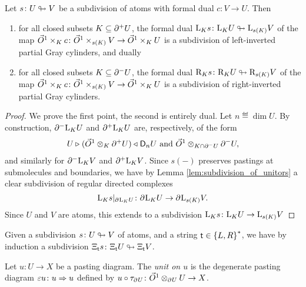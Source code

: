 \begin{lem} \label{lem:subdivision_of_invertors}
    Let \( s \colon U \looparrowright V \) be a subdivision of atoms with formal dual \( c \colon V \to U \).
    Then
    \begin{enumerate}
        \item for all closed subsets \( K \subseteq \partial_{}^{+} U \), the formal dual \( \mathrm{L}_{K} s \colon \mathrm{L}_{K} U \looparrowright \mathrm{L}_{s(K)} V \) of the map \( \vec{O}^{1} \times_K c \colon \vec{O}^{1} \times_{s(K)} V \to \vec{O}^{1} \times_K U \) is a subdivision of left-inverted partial Gray cylinders, and dually
        \item for all closed subsets \( K \subseteq \partial_{}^{-} U \), the formal dual \( \mathrm{R}_{K} s \colon \mathrm{R}_{K} U \looparrowright \mathrm{R}_{s(K)} V \) of the map \( \vec{O}^{1} \times_K c \colon \vec{O}^{1} \times_{s(K)} V \to \vec{O}^{1} \times_K U \)  is a subdivision of right-inverted partial Gray cylinders.
    \end{enumerate}
\end{lem}
\begin{proof}
    We prove the first point, the second is entirely dual.
    Let \( n \eqdef \dim U \).
    By construction, \( \partial_{}^{-} \mathrm{L}_{K} U \) and \( \partial_{}^{+} \mathrm{L}_{K} U \) are, respectively, of the form
    \begin{equation*}
        U \triangleright_{} (\vec{O}^{1} \otimes_K \partial_{}^{+} U) \prescript{}{\!}{\triangleleft}\; \mathsf{D}_{n}{U} \text{ and } \vec{O}^{1} \otimes_{K \cap \partial_{}^{-} U} \partial_{}^{-} U,
    \end{equation*}
    and similarly for \( \partial_{}^{-} \mathrm{L}_{K} V \) and \( \partial_{}^{+} \mathrm{L}_{K} V \).
    Since \( s(-) \) preserves pastings at submolecules and boundaries, we have by Lemma \ref{lem:subdivision_of_unitors} a clear subdivision of regular directed complexes 
    \begin{equation*}
        \restr{\lcyl{K} s}{\bd{}{} \lcyl{K} U} \colon \bd{}{} \lcyl{K} U \to \bd{}{} \lcyl{s(K)} V.
    \end{equation*}
    Since \( U \) and \( V \) are atoms, this extends to a subdivision \( \mathrm{L}_{K} s \colon \mathrm{L}_{K} U \to \mathrm{L}_{s(K)} V \)
\end{proof}

\begin{rmk}
    Given a subdivision \( s \colon U \looparrowright V \) of atoms, and a string \( \mathsf{t} \in \left\{ {L, R} \right\}^* \), we have by induction a subdivision \( \Xi_{\mathsf{t}} s \colon \Xi_{\mathsf{t}} U \looparrowright \Xi_{\mathsf{t}} V \).
\end{rmk}

\begin{dfn} [Unit]
    Let \( u \colon U \to X \) be a pasting diagram.
    The \emph{unit on \( u \)} is the degenerate pasting diagram \( \varepsilon u \colon u \Rightarrow u \) defined by \( u \circ \tau_{\partial_{}^{} U} \colon \vec{O}^{1} \otimes_{\partial_{}^{}U} U \to X \).
\end{dfn}

